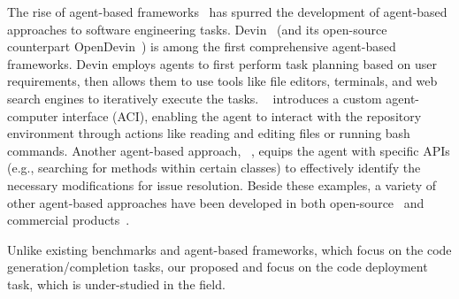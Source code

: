 The rise of agent-based frameworks~\cite{xi2023rise} has spurred the development of agent-based approaches to software engineering tasks. Devin~\cite{devinwebpage} (and its open-source counterpart OpenDevin~\cite{opendevin}) is among the first comprehensive \llm agent-based frameworks. Devin employs agents to first perform task planning based on user requirements, then allows them to use tools like file editors, terminals, and web search engines to iteratively execute the tasks. \sweagent~\cite{sweagent} introduces a custom agent-computer interface (ACI), enabling the \llm agent to interact with the repository environment through actions like reading and editing files or running bash commands. Another agent-based approach, \autocoderover~\cite{autocoderover}, equips the \llm agent with specific APIs (e.g., searching for methods within certain classes) to effectively identify the necessary modifications for issue resolution. Beside these examples, a variety of other agent-based approaches have been developed in both open-source~\cite{aidar} and commercial products~\cite{bouzenia2024repairagent, coder, repounderstander, lingma, factorydroid, ibmagent, opencsgstarship, marscode, amazonqdeveloper}.


Unlike existing benchmarks and agent-based frameworks, which focus on the code generation/completion tasks, our proposed \model and \agent focus on the code deployment task, which is under-studied in the field.